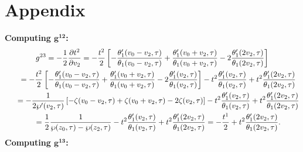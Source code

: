 \documentclass[pdftex]{sigma}%
\numberwithin{equation}{section}
\begin{document}
\section{Appendix}\label{appendixA}
\textbf{Computing $\boldsymbol {g^{12}}$:}
\begin{gather*}
g^{23}=-\frac{1}{2}\frac{\partial t^{2}}{\partial v_2}=-\frac{t^2}{2}\left[-\frac{\theta_1^{\prime}(v_0-v_2,\tau)}{\theta_1(v_0-v_2,\tau)} +\frac{\theta_1^{\prime}(v_0+v_2,\tau)}{\theta_1(v_0+v_2,\tau)} -2\frac{\theta_1^{\prime}(2v_2,\tau)}{\theta_1(2v_2,\tau)}\right]
\\ \hphantom{g^{23}}
{}=-\frac{t^2}{2}\left[-\frac{\theta_1^{\prime}(v_0-v_2,\tau)}{\theta_1(v_0-v_2,\tau)} +\frac{\theta_1^{\prime}(v_0+v_2,\tau)}{\theta_1(v_0+v_2,\tau)} -2\frac{\theta_1^{\prime}(v_2,\tau)}{\theta_1(v_2,\tau)}\right] -t^2\frac{\theta_1^{\prime}(v_2,\tau)}{\theta_1(v_2,\tau)}
+t^2\frac{\theta_1^{\prime}(2v_2,\tau)}{\theta_1(2v_2,\tau)}
\\ \hphantom{g^{23}}
{}=-\frac{1}{2\wp^{\prime}(v_2,\tau)}\left[-\zeta(v_0-v_2,\tau)+\zeta(v_0+v_2,\tau) -2\zeta(v_2,\tau)\right]-t^2\frac{\theta_1^{\prime}(v_2,\tau)}{\theta_1(v_2,\tau)}
+t^2\frac{\theta_1^{\prime}(2v_2,\tau)}{\theta_1(2v_2,\tau)}
\\ \hphantom{g^{23}}
{}=\frac{1}{2}\frac{1}{\wp(z_0,\tau)-\wp(z_2,\tau)} -t^2\frac{\theta_1^{\prime}(v_2,\tau)}{\theta_1(v_2,\tau)} +t^2\frac{\theta_1^{\prime}(2v_2,\tau)}{\theta_1(2v_2,\tau)}
=-\frac{t^1}{2}+t^2\frac{\theta_1^{\prime}(2v_2,\tau)}{\theta_1(2v_2,\tau)}.
\end{gather*}
\textbf{Computing $\boldsymbol {g^{13}}$:}
\end{document}
